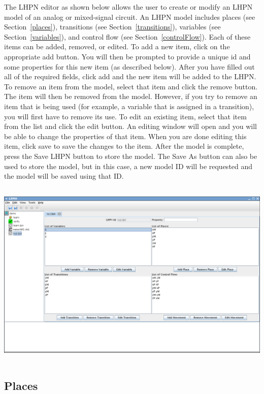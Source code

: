 \documentclass[titlepage,11pt]{article}
\begin{document}
\noindent
The LHPN editor as shown below allows the user to create or modify an LHPN
model of an analog or mixed-signal circuit.  An LHPN model includes
places (see Section~\ref{places}),
transitions (see Section~\ref{transitions}), 
variables (see Section~\ref{variables}), and
control flow (see Section~\ref{controlFlow}).
Each of these items can be added, removed, or edited. 
To add a new item, click on the appropriate add button. You
will then be prompted to provide a unique id and some properties
for this new item (as described below). After you have filled out
all of the required fields, click add and the new item will be
added to the LHPN.
To remove an item from the model, select that item and click
the remove button. The item will then be removed from the model.
However, if you try to remove an item that is being used 
(for example, a variable that is assigned in a transition), you will first have 
to remove its use.
To edit an existing item, select that item from the list and
click the edit button. An editing window will open and you will
be able to change the properties of that item. When you are done
editing this item, click save to save the changes to the item. 
After the model is complete, press the Save LHPN button to store
the model. The Save As button can also be used to store the
model, but in this case, a new model ID will be requested and the
model will be saved using that ID. 
\begin{center}
\includegraphics[height=90mm]{screenshots/LHPNedit}
\end{center}

\subsection{\label{places}Places}
\end{document}
